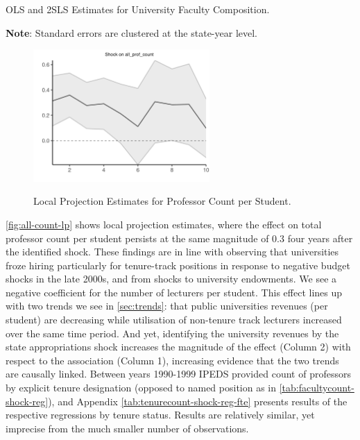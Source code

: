 \documentclass[notitlepage,12pt]{article}
\begin{document}
\begin{table}[!h]
    \onehalfspacing
    \centering
    \caption{OLS and 2SLS Estimates for University Faculty Composition.}
    \makebox[\textwidth][c]{}
    \begin{flushleft}
        \footnotesize
        \textbf{Note}: Standard errors are clustered at the state-year level.
    \end{flushleft}
    \label{tab:facultycount-shock-reg}
\end{table}

\begin{figure}[h!]
    \centering
    \caption{Local Projection Estimates for Professor Count per Student.}
    \includegraphics[width=0.6\textwidth]{figures/all-count-lp.png}
    \label{fig:all-count-lp}
\end{figure}
\autoref{fig:all-count-lp} shows local projection estimates, where the effect on total professor count per student persists at the same magnitude of 0.3 four years after the identified shock.
These findings are in line with \cite{turner2014impact} observing that universities froze hiring particularly for tenure-track positions in response to negative budget shocks in the late 2000s, and \cite{brown2014endowment} from shocks to university endowments.
We see a negative coefficient for the number of lecturers per student.
This effect lines up with two trends we see in \autoref{sec:trends}: that public universities revenues (per student) are decreasing while utilisation of non-tenure track lecturers increased over the same time period.
And yet, identifying the university revenues by the state appropriations shock increases the magnitude of the effect (Column 2) with respect to the association (Column 1), increasing evidence that the two trends are causally linked.
Between years 1990-1999 IPEDS provided count of professors by explicit tenure designation (opposed to named position as in \autoref{tab:facultycount-shock-reg}), and Appendix \autoref{tab:tenurecount-shock-reg-fte} presents results of the respective regressions by tenure status.
Results are relatively similar, yet imprecise from the much smaller number of observations.
\end{document}
